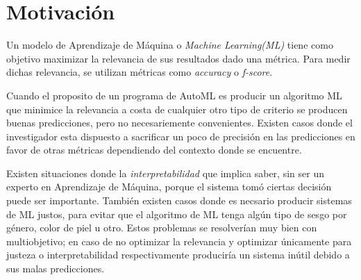 


\section*{Motivaci\'on}

Un modelo de Aprendizaje de M\'aquina o \textit{Machine Learning(ML)}  tiene como objetivo maximizar la relevancia de sus resultados dado una m\'etrica. Para medir dichas relevancia, se utilizan m\'etricas como \textit{accuracy} o \textit{f-score}. 

Cuando el proposito de un programa de AutoML es producir un algoritmo ML que minimice la relevancia a costa de cualquier otro tipo de criterio  se producen buenas predicciones, pero no necesariemente convenientes. Existen casos donde el investigador esta dispuesto a sacrificar un poco de precisi\'on en las predicciones en favor de otras m\'etricas dependiendo del contexto donde se encuentre. 

Existen situaciones donde la \textit{interpretabilidad} que implica saber, sin ser un experto en Aprendizaje de M\'aquina, porque el sistema tom\'o ciertas decisi\'on puede ser importante.
Tambi\'en existen casos donde es necsario producir sistemas de ML justos, para evitar que el algoritmo de ML tenga alg\'un tipo de sesgo por g\'enero, color de piel u otro. 
Estos problemas se resolver\'ian muy bien con multiobjetivo; en caso de no optimizar la relevancia y optimizar \'unicamente para justeza o interpretabilidad respectivamente producir\'ia un sistema in\'util debido a sus malas predicciones.

